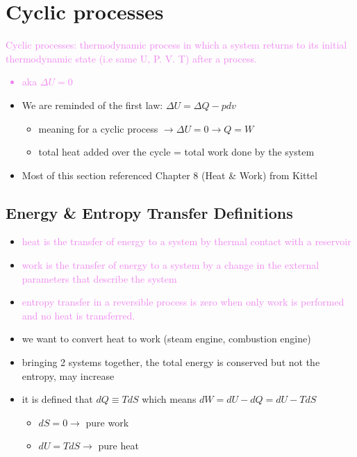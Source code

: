 
\section{Cyclic processes}

\textcolor{violet}{Cyclic processes: thermodynamic process in which a system returns to its initial
	thermodynamic state (i.e same U, P. V. T) after a process.
	\begin{itemize}
		\item aka $\Delta U = 0$
	\end{itemize}
}
\begin{itemize}
	\item We are reminded of the first law: $\Delta U = \Delta Q - p dv$
	      \begin{itemize}
		      \item meaning for a cyclic process  $\rightarrow \Delta U = 0 \rightarrow Q = W$
		      \item total heat added over the cycle = total work done by the system
	      \end{itemize}
	\item Most of this section referenced Chapter 8 (Heat \& Work) from Kittel
\end{itemize}


\subsection{Energy \& Entropy Transfer Definitions}
\begin{itemize}
	\item \textcolor{violet}{heat is the transfer of energy to a system by thermal contact
		      with a reservoir}
	\item \textcolor{violet}{work is the transfer of energy to a system by a change in the
		      external parameters that describe the system}
    \item \textcolor{violet}{entropy transfer in a reversible process is zero when only work is
    performed and no heat is transferred.}
	\item we want to convert heat to work (steam engine, combustion engine)
	\item bringing 2 systems together, the total energy is conserved but not the entropy,
	      may increase
	\item it is defined that $dQ \equiv T dS$ which means $dW = dU - dQ = dU - TdS$
	      \begin{itemize}
		      \item $dS = 0 \rightarrow$ pure work
		      \item $dU = TdS \rightarrow$ pure heat
	      \end{itemize}
\end{itemize}


